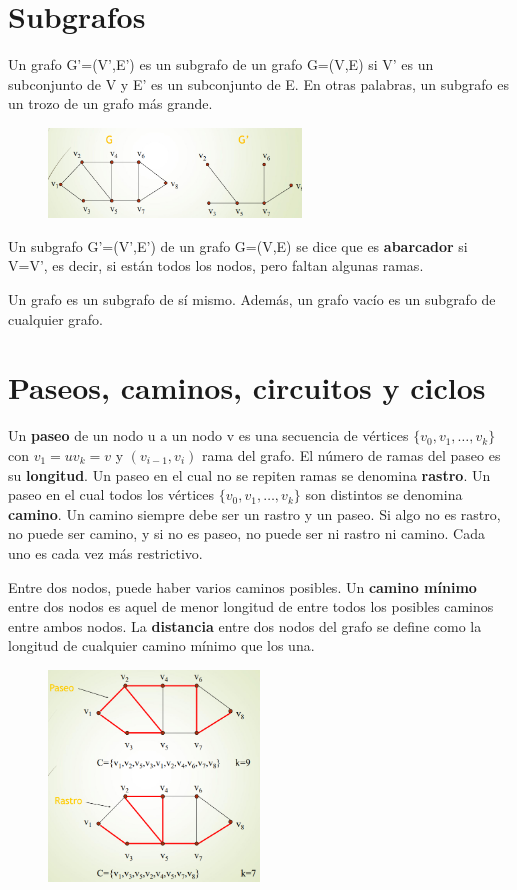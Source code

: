 \section{Subgrafos}
Un grafo G’=(V’,E’) es un subgrafo de un grafo G=(V,E) si V’ es un subconjunto de V y E’ es un subconjunto de E. En otras palabras, un subgrafo es un trozo de un grafo más grande. 

\begin{figure}[h]
\centering
\includegraphics[width = 0.6\textwidth]{figs/subgrafo.png}
\end{figure}

Un subgrafo G’=(V’,E’) de un grafo G=(V,E) se dice que es \textbf{abarcador} si V=V’, es decir, si están todos los nodos, pero faltan algunas ramas.

Un grafo es un subgrafo de sí mismo. Además, un grafo vacío es un subgrafo de cualquier grafo.

\section{Paseos, caminos, circuitos y ciclos}
Un \textbf{paseo} de un nodo u a un nodo v es una secuencia de vértices $\{v_0, v_1, \ldots, v_k\}$ con $v_1 = u v_k = v$ y $(v_{i-1}, v_i)$ rama del grafo. El número de ramas del paseo es su \textbf{longitud}. Un paseo en el cual no se repiten ramas se denomina \textbf{rastro}. Un paseo en el cual todos los vértices $\{v_0, v_1, \ldots, v_k\}$ son distintos se denomina \textbf{camino}. 
Un camino siempre debe ser un rastro y un paseo. Si algo no es rastro, no puede ser camino, y si no es paseo, no puede ser ni rastro ni camino. Cada uno es cada vez más restrictivo.

Entre dos nodos, puede haber varios caminos posibles. Un \textbf{camino mínimo} entre dos nodos es aquel de menor longitud de entre todos los posibles caminos entre ambos nodos. La \textbf{distancia} entre dos nodos del grafo se define como la longitud de cualquier camino mínimo que los una.

\begin{figure}[h]
\centering
\includegraphics[width = 0.5\textwidth]{figs/paseo-rastro.png}
\end{figure}

